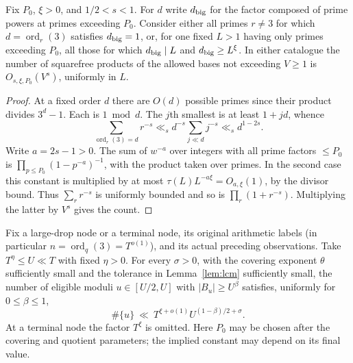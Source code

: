 \begin{lemma}\label{lem:basecatalog}
Fix $P_0$, $\xi>0$, and $1/2<s<1$. For $d$ write $d_{\rm big}$ for the
factor composed of prime powers at primes exceeding $P_0$. Consider
either all primes $r\ne3$ for which $d=\operatorname{ord}_r(3)$
satisfies $d_{\rm big}=1$, or, for one fixed $L>1$ having only primes exceeding
$P_0$, all those for which $d_{\rm big}\mid L$ and $d_{\rm big}\ge L^\xi$.
In either catalogue the number of squarefree products of the allowed
bases not exceeding $V\ge1$ is $O_{s,\xi,P_0}(V^s)$, uniformly in $L$.
\end{lemma}
\begin{proof}
At a fixed order $d$ there are $O(d)$ possible primes since their
product divides $3^d-1$. Each is $1\bmod d$. The $j$th smallest is
at least $1+jd$, whence
\[
 \sum_{\operatorname{ord}_r(3)=d}r^{-s}
 \ll_s d^{-s}\sum_{j\ll d}j^{-s}\ll_s d^{1-2s}.
\]
Write $a=2s-1>0$. The sum of $w^{-a}$ over integers with all prime
factors $\le P_0$ is $\prod_{p\le P_0}(1-p^{-a})^{-1}$, with the
product taken over primes. In the second case this constant is
multiplied by at most $\tau(L)L^{-a\xi}=O_{a,\xi}(1)$, by the divisor
bound. Thus $\sum_r r^{-s}$ is uniformly bounded and so is
$\prod_r(1+r^{-s})$. Multiplying the latter by $V^s$ gives the count.
\end{proof}

\begin{proposition}\label{prop:tariff}
Fix a large-drop node or a terminal node, its original arithmetic
labels (in particular $n=\operatorname{ord}_q(3)=T^{o(1)}$), and
its actual preceding observations. Take $T^\eta\le U\ll T$ with
fixed $\eta>0$. For every $\sigma>0$, with the covering exponent
$\theta$ sufficiently small and the tolerance in Lemma~\ref{lem:lcm}
sufficiently small, the number of eligible moduli $u\in[U/2,U]$ with
$|B_u|\ge U^\beta$ satisfies, uniformly for $0\le\beta\le1$,
\[
 \#\{u\}\ \ll\ T^{\xi+o(1)}U^{(1-\beta)/2+\sigma}.
\]
At a terminal node the factor $T^\xi$ is omitted. Here $P_0$ may be
chosen after the covering and quotient parameters; the implied
constant may depend on its final value.
\end{proposition}

